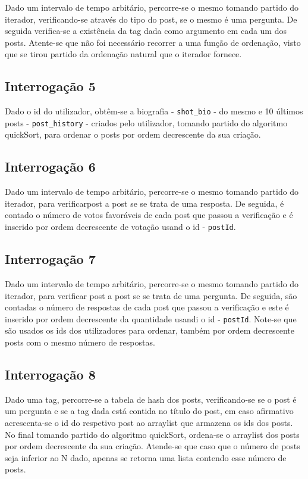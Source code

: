 \documentclass[4apaper]{report}
\begin{document}
Dado um intervalo de tempo arbitário, percorre-se o mesmo tomando partido do iterador, verificando-se através do tipo do post, se o mesmo é uma pergunta. De seguida verifica-se a existência da tag dada como argumento em cada um dos posts. Atente-se que não foi necessário recorrer a uma função de ordenação, visto que se tirou partido da ordenação natural que o iterador fornece.

\subsection{Interrogação 5}

Dado o id do utilizador, obtêm-se a biografia - \texttt{shot\_bio} - do mesmo e 10 últimos posts - \texttt{post\_history} - criados pelo utilizador, tomando partido do algoritmo quickSort, para ordenar o posts por ordem decrescente da sua criação. 

\subsection{Interrogação 6}

Dado um intervalo de tempo arbitário, percorre-se o mesmo tomando partido do iterador, para verificarpost a post se se trata de uma resposta. De seguida, é contado o número de votos favoráveis de cada post que passou a verificação e é inserido por ordem decrescente de votação usand o id - \texttt{postId}. 

\subsection{Interrogação 7}

Dado um intervalo de tempo arbitário, percorre-se o mesmo tomando partido do iterador, para verificar post a post se se trata de uma pergunta. De seguida, são contadas o número de respostas de cada post que passou a verificação e este é inserido por ordem decrescente da quantidade usandi o id - \texttt{postId}. Note-se que são usados os ids dos utilizadores para ordenar, também por ordem decrescente posts com o mesmo número de respostas. 

\subsection{Interrogação 8}

Dado uma tag, percorre-se a tabela de hash dos posts, verificando-se se o post é um pergunta e se a tag dada está contida no título do post, em caso afirmativo acrescenta-se o id do respetivo post ao arraylist que armazena os ids dos posts. No final tomando partido do algoritmo quickSort, ordena-se o arraylist dos posts por ordem decrescente da sua criação. Atende-se que caso que o número de posts seja inferior ao N dado, apenas se retorna uma lista contendo esse número de posts.
\end{document}
